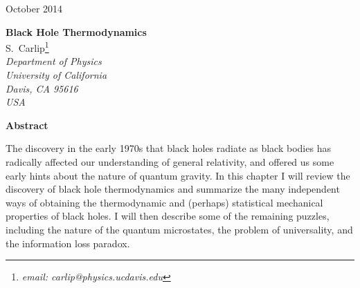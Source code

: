 \documentclass[11pt]{article}
\begin{document}
\begin{titlepage}
\vspace{.5in}
\begin{flushright}
October 2014\\  %
\end{flushright}
\vspace{.5in}
\begin{center}
{\Large\bf
 Black Hole Thermodynamics}\\  %
\vspace{.4in}
{S.~C{\sc arlip}\footnote{\it email: carlip@physics.ucdavis.edu}\\
       {\small\it Department of Physics}\\
       {\small\it University of California}\\
       {\small\it Davis, CA 95616}\\{\small\it USA}}
\end{center}

\vspace{.5in}
\begin{center}
{\large\bf Abstract}
\end{center}
\begin{center}
\begin{minipage}{4.75in}
{\small
The discovery in the early 1970s that black holes radiate as black bodies has 
radically affected our understanding of general relativity, and offered us some 
early hints about the nature of quantum gravity.  In this chapter I will review 
the discovery of black hole thermodynamics and summarize the many independent 
ways of obtaining the thermodynamic and (perhaps) statistical mechanical properties 
of black holes.  I will then describe some of the remaining puzzles, including the 
nature of the quantum microstates, the problem of universality, and the information 
loss paradox.
}
\end{minipage}
\end{center}
\end{titlepage}
\addtocounter{footnote}{-1}
 
\end{document}
